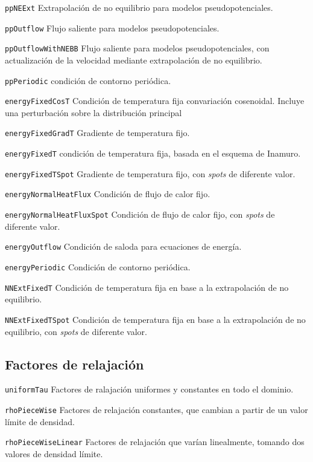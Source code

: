 \texttt{ppNEExt}\: Extrapolaci\'on de no equilibrio para modelos pseudopotenciales.
\medskip

\texttt{ppOutflow}\: Flujo saliente para modelos pseudopotenciales.
\medskip

\texttt{ppOutflowWithNEBB}\: Flujo saliente para modelos pseudopotenciales, con actualizaci\'on de la velocidad mediante extrapolaci\'on de no equilibrio.
\medskip

\texttt{ppPeriodic}\: condici\'on de contorno peri\'odica.
\medskip

\texttt{energyFixedCosT}\: Condici\'on de temperatura fija convariaci\'on cosenoidal. Incluye una perturbaci\'on sobre la distribuci\'on principal
\medskip

\texttt{energyFixedGradT}\: Gradiente de temperatura fijo.
\medskip

\texttt{energyFixedT}\: condici\'on de temperatura fija, basada en el esquema de Inamuro.
\medskip

\texttt{energyFixedTSpot}\: Gradiente de temperatura fijo, con \emph{spots} de diferente valor.
\medskip

\texttt{energyNormalHeatFlux}\: Condici\'on de flujo de calor fijo.
\medskip

\texttt{energyNormalHeatFluxSpot}\: Condici\'on de flujo de calor fijo, con \emph{spots} de diferente valor.
\medskip

\texttt{energyOutflow}\: Condici\'on de saloda para ecuaciones de energ\'ia.
\medskip

\texttt{energyPeriodic}\: Condici\'on de contorno peri\'odica.
\medskip

\texttt{NNExtFixedT}\: Condici\'on de temperatura fija en base a la extrapolaci\'on de no equilibrio.
\medskip

\texttt{NNExtFixedTSpot}\: Condici\'on de temperatura fija en base a la extrapolaci\'on de no equilibrio, con \emph{spots} de diferente valor.
\medskip



\subsection{Factores de relajaci\'on}

\texttt{uniformTau}\: Factores de ralajaci\'on uniformes y constantes en todo el dominio.
\medskip

\texttt{rhoPieceWise}\:  Factores de relajaci\'on constantes, que cambian a partir de un valor l\'imite de densidad.
\medskip

\texttt{rhoPieceWiseLinear}\: Factores de relajaci\'on que var\'ian linealmente, tomando dos valores de densidad l\'imite.

